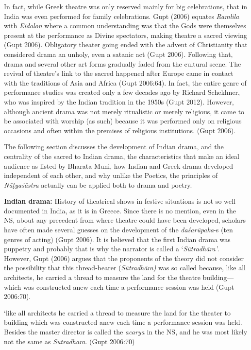 In fact, while Greek theatre was only reserved mainly for big celebrations, that in India was even performed for family celebrations. Gupt (2006) equates \textsl{Ramlila} with \textsl{Eidolon} where a common understanding was that the Gods were themselves present at the performance as Divine spectators, making theatre a sacred viewing (Gupt 2006). Obligatory theater going ended with the advent of Christianity that considered drama an unholy, even a satanic act (Gupt 2006). Following that, drama and several other art forms gradually faded from the cultural scene. The revival of theatre’s link to the sacred happened after Europe came in contact with the traditions of Asia and Africa (Gupt 2006:64). In fact, the entire genre of performance studies was created only a few decades ago by Richard Schekhner, who was inspired by the Indian tradition in the 1950s (Gupt 2012).  However, although ancient drama was not merely ritualistic or merely religious, it came to be associated with worship (as such) because it was performed only on religious occasions and often within the premises of religious institutions. (Gupt 2006). 

The following section discusses the development of Indian drama, and the centrality of the sacred to Indian drama, the characteristics that make an ideal audience as listed by Bharata Muni, how Indian and Greek drama developed independent of each other, and why unlike the Poetics, the principles of \textsl{Nāṭyaśāstra} actually can be applied both to drama and poetry. 

\textbf{Indian drama:} History of theatrical shows in festive situations is not so well documented in India, as it is in Greece. Since there is no mention, even in the NS, about any precedent from where theatre could have been developed, scholars have often made several guesses on the development of the \textsl{daśarūpaka}-s (ten genres of acting) (Gupt 2006).  It is believed that the first Indian drama was puppetry and probably that is why the narrator is called a ‘\textsl{Sūtradhāra’}. However, Gupt (2006) argues that the proponents of the theory did not consider the possibility that this thread-bearer (\textsl{Sūtradhāra)} was so called because, like all architects, he carried a thread to measure the land for the theatre building---which was constructed anew each time a performance session was held (Gupt 2006:70). 

\begin{myquote}
‘like all architects he carried a thread to measure the land for the theater to building which was constructed anew each time a performance session was held. Besides the master director is called the \textsl{acarya} in the NS, and he was most likely not the same as \textsl{Sutradhara}. 
\hfill (Gupt 2006:70)
\end{myquote}

